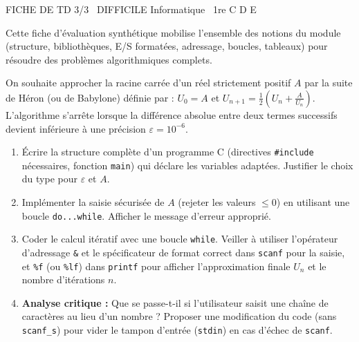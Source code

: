 \documentclass[11pt]{article}
\begin{document}
\begin{tcolorbox}[enhanced,colback=popink,colframe=popink,arc=10pt,boxrule=0pt,left=12pt,right=12pt,top=9pt,bottom=9pt]
{\color{white}\popxbold\small FICHE DE TD 3/3 \textbullet\ DIFFICILE \hfill Informatique \textbullet\ 1re C D E\par}
\end{tcolorbox}
\vspace{4pt}
Cette fiche d'évaluation synthétique mobilise l'ensemble des notions du module (structure, bibliothèques, E/S formatées, adressage, boucles, tableaux) pour résoudre des problèmes algorithmiques complets.

\begin{exercice}
On souhaite approcher la racine carrée d'un réel strictement positif $A$ par la suite de Héron (ou de Babylone) définie par :
$U_0 = A$ et $U_{n+1} = \frac{1}{2} \left( U_n + \frac{A}{U_n} \right)$.
L'algorithme s'arrête lorsque la différence absolue entre deux termes successifs devient inférieure à une précision $\varepsilon = 10^{-6}$.
\begin{enumerate}
    \item Écrire la structure complète d'un programme C (directives \texttt{\#include} nécessaires, fonction \texttt{main}) qui déclare les variables adaptées. Justifier le choix du type pour $\varepsilon$ et $A$.
    \item Implémenter la saisie sécurisée de $A$ (rejeter les valeurs $\le 0$) en utilisant une boucle \texttt{do...while}. Afficher le message d'erreur approprié.
    \item Coder le calcul itératif avec une boucle \texttt{while}. Veiller à utiliser l'opérateur d'adressage \texttt{\&} et le spécificateur de format correct dans \texttt{scanf} pour la saisie, et \texttt{\%f} (ou \texttt{\%lf}) dans \texttt{printf} pour afficher l'approximation finale $U_n$ et le nombre d'itérations $n$.
    \item \textbf{Analyse critique :} Que se passe-t-il si l'utilisateur saisit une chaîne de caractères au lieu d'un nombre ? Proposer une modification du code (sans \texttt{scanf\_s}) pour vider le tampon d'entrée (\texttt{stdin}) en cas d'échec de \texttt{scanf}.
\end{enumerate}
\end{exercice}
\end{document}
